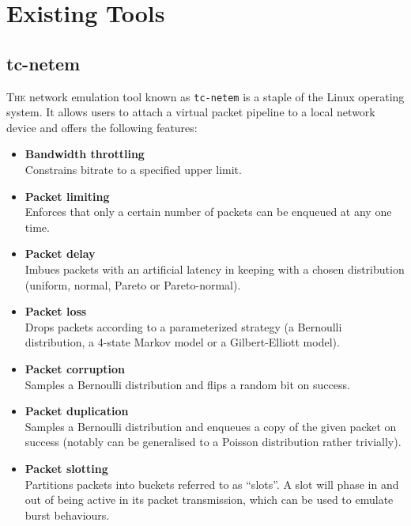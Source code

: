 \section{Existing Tools}

\subsection{tc-netem}

\lettrine{T}{he} network emulation tool known as \texttt{tc-netem} is a staple of the Linux operating
system\cite{tc_netem_wiki, tc_netem_8_man,tc_netem_src}. It allows users to attach a virtual packet pipeline to a
local network device and offers the following features:
\begin{itemize}
    \item \textbf{Bandwidth throttling} \\
    Constrains bitrate to a specified upper limit.
    \item \textbf{Packet limiting} \\
    Enforces that only a certain number of packets can be enqueued at any one time.
    \item \textbf{Packet delay} \\
    Imbues packets with an artificial latency in keeping with a chosen distribution (uniform, normal, Pareto or
    Pareto-normal).
    \item \textbf{Packet loss} \\
    Drops packets according to a parameterized strategy (a Bernoulli distribution, a 4-state Markov model or a
    Gilbert-Elliott model\cite{ge_model}).
    \item \textbf{Packet corruption} \\
    Samples a Bernoulli distribution and flips a random bit on success.
    \item \textbf{Packet duplication} \\
    Samples a Bernoulli distribution and enqueues a copy of the given packet on success (notably can be generalised to a
    Poisson distribution rather trivially).
    \item \textbf{Packet slotting} \\
    Partitions packets into buckets referred to as ``slots''. A slot will phase in and out of being active in its
    packet transmission, which can be used to emulate burst behaviours.
\end{itemize}


